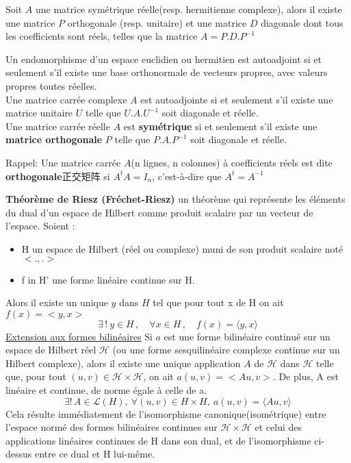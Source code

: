 \documentclass{book}
\begin{document}
\begin{theorem}
Soit $A$ une matrice sym\'etrique r\'eelle(resp. hermitienne complexe),
alors il existe une matrice $P$ orthogonale (resp. unitaire) et une matrice $D$ diagonale dont tous les coefficients sont r\'eels,
telles que la matrice $A = P.D.P^{-1}$
\end{theorem}

\begin{theorem}
Un endomorphisme d'un espace euclidien ou hermitien est autoadjoint
si et seulement s'il existe une base orthonormale de vecteurs propres, avec valeurs propres toutes r\'eelles.\\
Une matrice carr\'ee complexe $A$ est autoadjointe si et seulement s'il existe une matrice unitaire $U$ telle que $U.A.U^{-1}$ soit diagonale et r\'eelle.\\
Une matrice carr\'ee r\'eelle $A$ est \textbf{sym\'etrique} si et seulement s'il existe une \textbf{matrice orthogonale} $P$
telle que $P.A.P^{-1}$ soit diagonale et r\'eelle.
\end{theorem}
Rappel:
Une matrice carr\'ee $A$(n lignes, n colonnes) \`a coefficients r\'eels est dite \textbf{orthogonale}正交矩阵 si $A^t A = I_n$, c'est-\`a-dire que $A^t = A^{-1}$

\textbf{Th\'eor\`eme de Riesz (Fr\'echet-Riesz)}\newline
un th\'eor\`eme qui repr\'esente les \'el\'ements du dual d'un espace de Hilbert comme produit scalaire par un vecteur de l'espace.
Soient :
\begin{itemize}
	\item H un espace de Hilbert (r\'eel ou complexe) muni de son produit scalaire not\'e $<.,.>$
	\item f in H' une forme lin\'eaire continue sur H.
\end{itemize}
Alors il existe un unique $y$ dans $H$ tel que pour tout x de H on ait $f(x) = <y, x>$
$$
\exists\,!\ y \in H\,, \quad \forall x\in H\,, \quad f(x) = \langle y,x\rangle
$$
\underline{Extension aux formes bilin\'eaires}\newline
Si $a$ est une forme bilin\'eaire continu\'e sur un espace de Hilbert r\'eel $\mathcal{H}$ (ou une forme sesquilin\'eaire complexe continue sur un Hilbert complexe),
alors il existe une unique application $A$ de $\mathcal{H}$ dans $\mathcal{H}$ telle que,
pour tout $(u, v) \in \mathcal{H} \times \mathcal{H}$, on ait $a(u, v) = <Au, v>$.
De plus, A est lin\'eaire et continue, de norme \'egale \`a celle de a.
$$ \exists !\,A\in\mathcal{L}(H),\ \forall (u,v)\in H\times H,\ a(u,v)=\langle Au,v \rangle $$
Cela r\'esulte imm\'ediatement de l'isomorphisme canonique(isom\'etrique) entre l'espace norm\'e des formes bilin\'eaires continues sur
$\mathcal{H} \times \mathcal{H}$ et celui des applications lin\'eaires continues de H dans son dual, et de l'isomorphisme ci-dessus entre ce dual et H lui-m\^eme.
\bigskip
\end{document}
